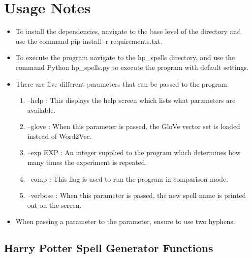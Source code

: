 \documentclass[letterpaper,10pt,english]{sphinxmanual}
\begin{document}
\chapter{Usage Notes}
\label{\detokenize{index:usage-notes}}\begin{itemize}
\item {} 
To install the dependencies, navigate to the base level of the directory and use the command \sphinxquotedblleft{}pip install -r requirements.txt\sphinxquotedblright{}.

\item {} 
To execute the program navigate to the \sphinxquotedblleft{}hp\_spells\sphinxquotedblright{} directory, and use the command \sphinxquotedblleft{}Python hp\_spells.py\sphinxquotedblright{} to execute the program with default settings.

\item {} 
There are five different parameters that can be passed to the program.
\begin{enumerate}
\item {} 
--help : This displays the help screen which lists what parameters are available.

\item {} 
--glove : When this parameter is passed, the GloVe vector set is loaded instead of Word2Vec.

\item {} 
--exp EXP : An integer supplied to the program which determines how many times the experiment is repeated.

\item {} 
--comp : This flag is used to run the program in comparison mode.

\item {} 
--verbose : When this parameter is passed, the new spell name is printed out on the screen.

\end{enumerate}

\item {} 
When passing a parameter to the parameter, ensure to use two hyphens.

\end{itemize}


\section{Harry Potter Spell Generator Functions}
\label{\detokenize{code:module-hp_spells}}\label{\detokenize{code:harry-potter-spell-generator-functions}}\label{\detokenize{code::doc}}
\end{document}
